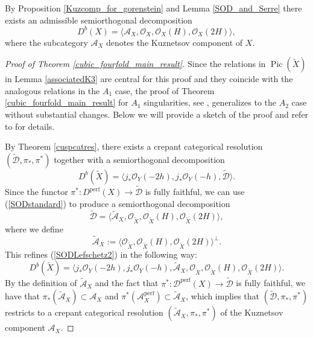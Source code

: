 \documentclass[a4paper, twoside, 11pt]{amsart}
\theoremstyle{definition}
\theoremstyle{remark}
\numberwithin{equation}{theorem}
\DeclareMathOperator{\lilperf}{perf}
\DeclareMathOperator{\picard}{Pic}
\newcommand{\dbx}{D^b(X)}
\newcommand{\perf}{\mathcal{D}^{\text{perf}}}
\begin{document}
By Proposition \ref{Kuzcomp_for_gorenstein} and Lemma \ref{SOD_and_Serre} there exists an admissible semiorthogonal decomposition
\begin{equation}\label{SODstandard}
	\dbx = \langle \mathcal{A}_X, \mathcal{O}_X,\mathcal{O}_X(H),\mathcal{O}_X(2H) \rangle,
\end{equation}
where the subcategory $\mathcal{A}_X$ denotes the Kuznetsov component of $X$. 
\begin{proof}[Proof of Theorem \ref{cubic_fourfold_main_result}]
    Since the relations in $\picard(\widetilde{X})$ in Lemma \ref{associatedK3} are central for this proof and they coincide with the analogous relations in the $A_1$ case, the proof of Theorem \ref{cubic_fourfold_main_result} for $A_1$ singularities, see \cite[Theorem 5.2]{dervied_cat_cubic_fourfold}, generalizes to the $A_2$ case without substantial changes. Below we will provide a sketch of the proof and refer to \cite[Theorem 5.2]{dervied_cat_cubic_fourfold} for details.
    
	By Theorem \ref{cuspcatres}, there exists a crepant categorical resolution $(\widetilde{\mathcal{D}}, \pi_*,\pi^*)$ together with 
    a semiorthogonal decomposition
	\begin{equation}\label{SODLefschetz2}
		D^b(\widetilde{X})= \langle j_*\mathcal{O}_Y(-2h), j_* \mathcal{O}_Y(-h),\widetilde{\mathcal{D}}\rangle.
	\end{equation} 
	Since the functor $\pi^*\colon D^{\lilperf}(X) \to \widetilde{\mathcal{D}}$ is fully faithful, we can use (\ref{SODstandard}) to produce a semiorthogonal decomposition
	\begin{equation}\label{SOD_Dtilde}
		\widetilde{\mathcal{D}} = \langle \widetilde{\mathcal{A}}_X, \mathcal{O}_{\widetilde{X}},\mathcal{O}_{\widetilde{X}}(H),\mathcal{O}_{\widetilde{X}}(2H) \rangle,
	\end{equation}
	where we define 
    \begin{equation*}
        \widetilde{\mathcal{A}}_X :=\langle \mathcal{O}_{\widetilde{X}}, \mathcal{O}_{\widetilde{X}}(H), \mathcal{O}_{\widetilde{X}}(2H) \rangle^\bot.
    \end{equation*}
    This refines (\ref{SODLefschetz2}) in the following way:
	\begin{equation}\label{SOD1}
		D^b(\widetilde{X})= \langle j_*\mathcal{O}_Y(-2h), j_*\mathcal{O}_Y(-h),\widetilde{\mathcal{A}}_X, \mathcal{O}_{\widetilde{X}},\mathcal{O}_{\widetilde{X}}(H),\mathcal{O}_{\widetilde{X}}(2H) \rangle.
	\end{equation}
    By the definition of $\widetilde{\mathcal{A}}_X$ and the fact that $\pi^*\colon \perf(X) \to \widetilde{\mathcal{D}}$ is fully faithful, we have that $\pi_*(\widetilde{\mathcal{A}}_X) \subset \mathcal{A}_X$ and $\pi^*(\mathcal{A}_X^{\lilperf}) \subset \widetilde{\mathcal{A}}_X$, which implies that $(\widetilde{\mathcal{D}}, \pi_*,\pi^*)$ restricts to a crepant categorical resolution $(\widetilde{\mathcal{A}}_X, \pi_*,\pi^*)$ of the Kuznetsov component $\mathcal{A}_X$.
    

\end{proof}
\end{document}
